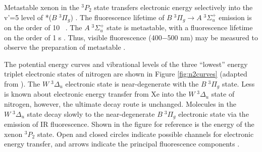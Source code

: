 \documentclass[12pt]{mitthesis}
\begin{document}
Metastable xenon in the $^3P_2$ state transfers electronic energy
selectively into the v'=5 level of *($B \; ^3\Pi_g$)
\cite{krumpelmann87, krumpelmann88, ottinger95b, aardema94}.  The
fluorescence lifetime of $B \; ^3\Pi_g \rightarrow A \; ^3\Sigma_u^+$
emission is on the order of 10 \microsec\ \cite{lofthus77}.  The $A \;
^3\Sigma_u^+$ state is metastable, with a fluorescence lifetime on the
order of 1 s \cite{lofthus77}.  Thus, visible fluorescence (400$-$500
nm) may be measured to observe the preparation of metastable .

The potential energy curves and vibrational levels of the three
``lowest'' energy triplet electronic states of nitrogen are shown in
Figure \ref{fig:n2curves} (adapted from \cite{krumpelmann87}).  The $W
\; ^3\Delta_u$ electronic state is near-degenerate with the $B \;
^3\Pi_g$ state.  Less is known about electronic energy transfer from
Xe into the $W \; ^3\Delta_u$ state of nitrogen, however, the ultimate
decay route is unchanged.  Molecules in the $W \; ^3\Delta_u$ state
decay slowly to the near-degenerate $B \; ^3\Pi_g$ electronic state
via the emission of IR fluorescence.  Shown in the figure for
reference is the energy of the xenon $^3P_2$ state.  Open and closed
circles indicate possible channels for electronic energy transfer, and
arrows indicate the principal fluorescence components
\cite{krumpelmann87}.
\end{document}
